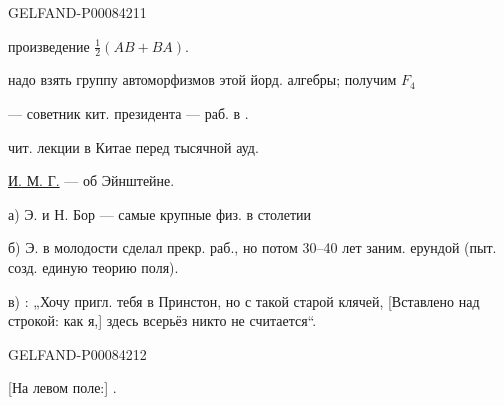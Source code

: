 \begin{GelfandAdjacentEvidence}{GELFAND-P000842}{11}


произведение \(\frac12(AB+BA)\).

надо взять группу автоморфизмов этой йорд. алгебры; получим \(F_4\)

 — советник кит. президента — раб. в .

 чит. лекции в Китае перед тысячной ауд.

\uline{И. М. Г.} —  об Эйнштейне.

а) Э. и Н. Бор — самые крупные физ. в столетии

б) Э. в молодости сделал прекр. раб., но потом 30–40 лет заним. ерундой (пыт. созд. единую теорию поля).

в) : „Хочу пригл. тебя в Принстон, но с такой старой клячей, [Вставлено над строкой: как я,] здесь всерьёз никто не считается“.
\end{GelfandAdjacentEvidence}
\begin{GelfandAdjacentEvidence}{GELFAND-P000842}{12}


[На левом поле:] .
\end{GelfandAdjacentEvidence}
